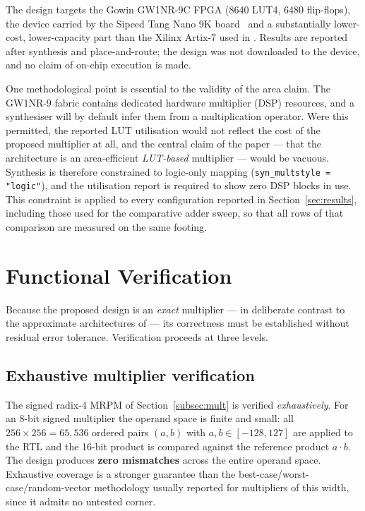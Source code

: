 \documentclass[conference]{IEEEtran}
\begin{document}
The design targets the Gowin GW1NR-9C FPGA (8640 LUT4, 6480 flip-flops),
the device carried by the Sipeed Tang Nano 9K board~\cite{tangnano} and a substantially
lower-cost, lower-capacity part than the Xilinx Artix-7 used in
\cite{base}. Results are reported after synthesis and place-and-route;
the design was not downloaded to the device, and no claim of on-chip
execution is made.

One methodological point is essential to the validity of the area claim.
The GW1NR-9 fabric contains dedicated hardware multiplier (DSP)
resources, and a synthesiser will by default infer them from a
multiplication operator. Were this permitted, the reported LUT
utilisation would not reflect the cost of the proposed multiplier at
all, and the central claim of the paper --- that the architecture is an
area-efficient \emph{LUT-based} multiplier --- would be vacuous.
Synthesis is therefore constrained to logic-only mapping
(\texttt{syn\_multstyle = "logic"}), and the utilisation report is
required to show zero DSP blocks in use. This constraint is applied to
every configuration reported in Section~\ref{sec:results}, including
those used for the comparative adder sweep, so that all rows of that
comparison are measured on the same footing.

\section{Functional Verification}
\label{sec:verif}

Because the proposed design is an \emph{exact} multiplier --- in
deliberate contrast to the approximate architectures of
\cite{khurshid,approx2025} --- its correctness must be established
without residual error tolerance. Verification proceeds at three
levels.

\subsection{Exhaustive multiplier verification}

The signed radix-4 MRPM of Section~\ref{subsec:mult} is verified
\emph{exhaustively}. For an 8-bit signed multiplier the operand space
is finite and small: all $256 \times 256 = 65{,}536$ ordered pairs
$(a,b)$ with $a, b \in [-128, 127]$ are applied to the RTL and the
16-bit product is compared against the reference product $a \cdot b$.
The design produces \textbf{zero mismatches} across the entire operand
space. Exhaustive coverage is a stronger guarantee than the
best-case/worst-case/random-vector methodology usually reported for
multipliers of this width, since it admits no untested corner.
\end{document}
